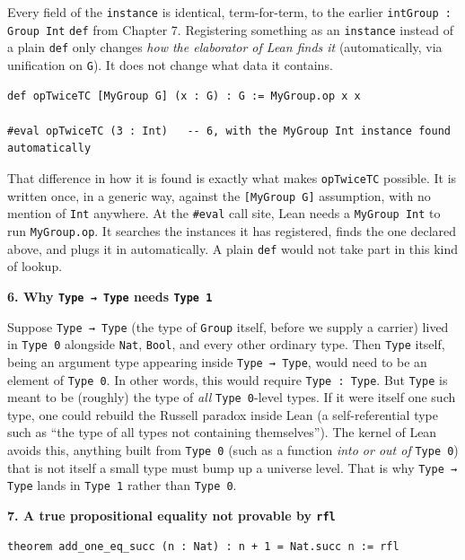 Every field of the \texttt{instance} is identical, term-for-term, to the earlier \texttt{intGroup : Group Int} \texttt{def} from Chapter 7. Registering something as an \texttt{instance} instead of a plain \texttt{def} only changes \emph{how the elaborator of Lean finds it} (automatically, via unification on \texttt{G}). It does not change what data it contains.

\begin{lstlisting}
def opTwiceTC [MyGroup G] (x : G) : G := MyGroup.op x x

#eval opTwiceTC (3 : Int)   -- 6, with the MyGroup Int instance found automatically
\end{lstlisting}

That difference in how it is found is exactly what makes \texttt{opTwiceTC} possible. It is written once, in a generic way, against the \texttt{[MyGroup G]} assumption, with no mention of \texttt{Int} anywhere. At the \texttt{\#eval} call site, Lean needs a \texttt{MyGroup Int} to run \texttt{MyGroup.op}. It searches the instances it has registered, finds the one declared above, and plugs it in automatically. A plain \texttt{def} would not take part in this kind of lookup.

\textbf{6. Why \texttt{Type → Type} needs \texttt{Type 1}}

Suppose \texttt{Type → Type} (the type of \texttt{Group} itself, before we supply a carrier) lived in \texttt{Type 0} alongside \texttt{Nat}, \texttt{Bool}, and every other ordinary type. Then \texttt{Type} itself, being an argument type appearing inside \texttt{Type → Type}, would need to be an element of \texttt{Type 0}. In other words, this would require \texttt{Type : Type}. But \texttt{Type} is meant to be (roughly) the type of \emph{all} \texttt{Type 0}-level types. If it were itself one such type, one could rebuild the Russell paradox inside Lean (a self-referential type such as ``the type of all types not containing themselves''). The kernel of Lean avoids this, anything built from \texttt{Type 0} (such as a function \emph{into or out of} \texttt{Type 0}) that is not itself a small type must bump up a universe level. That is why \texttt{Type → Type} lands in \texttt{Type 1} rather than \texttt{Type 0}.

\textbf{7. A true propositional equality not provable by \texttt{rfl}}

\begin{lstlisting}
theorem add_one_eq_succ (n : Nat) : n + 1 = Nat.succ n := rfl
\end{lstlisting}

